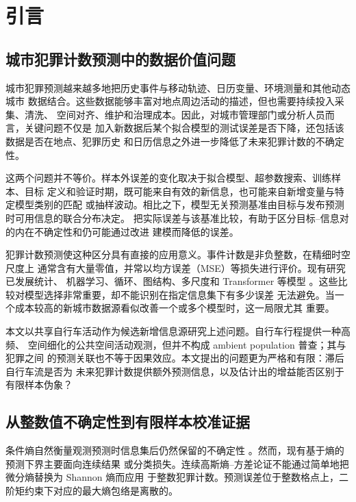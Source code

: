 \section{引言}
\label{sec:introduction}

\subsection{城市犯罪计数预测中的数据价值问题}
\label{subsec:intro_data_value}

城市犯罪预测越来越多地把历史事件与移动轨迹、日历变量、环境测量和其他动态城市
数据结合。这些数据能够丰富对地点周边活动的描述，但也需要持续投入采集、清洗、
空间对齐、维护和治理成本。因此，对城市管理部门或分析人员而言，关键问题不仅是
加入新数据后某个拟合模型的测试误差是否下降，还包括该数据是否在地点、犯罪历史
和日历信息之外进一步降低了未来犯罪计数的不确定性。

这两个问题并不等价。样本外误差的变化取决于拟合模型、超参数搜索、训练样本、目标
定义和验证时期，既可能来自有效的新信息，也可能来自新增变量与特定模型类别的匹配
或抽样波动。相比之下，模型无关预测基准由目标与发布预测时可用信息的联合分布决定。
把实际误差与该基准比较，有助于区分目标--信息对的内在不确定性和仍可能通过改进
建模而降低的误差。

犯罪计数预测使这种区分具有直接的应用意义。事件计数是非负整数，在精细时空尺度上
通常含有大量零值，并常以均方误差（MSE）等损失进行评价。现有研究已发展统计、
机器学习、循环、图结构、多尺度和 Transformer 等模型
\citep{kounadi2020review,du2023review,mandalapu2023review,
alves2018crime,angbera2023model,huang2018deepcrime,deng2023risk,
jing2024multiscale,wang2025mragnn,butt2025start,cui2026transfer,
hu2023fusion}。这些比较对模型选择非常重要，却不能识别在指定信息集下有多少误差
无法避免。当一个成本较高的新城市数据源看似改善一个或多个模型时，这一局限尤其
重要。

本文以共享自行车活动作为候选新增信息源研究上述问题。自行车行程提供一种高频、
空间细化的公共空间活动观测，但并不构成 ambient population 普查；其与犯罪之间
的预测关联也不等于因果效应。本文提出的问题更为严格和有限：滞后自行车流是否为
未来犯罪计数提供额外预测信息，以及估计出的增益能否区别于有限样本伪象？

\subsection{从整数值不确定性到有限样本校准证据}
\label{subsec:intro_calibrated_evidence}

条件熵自然衡量观测预测时信息集后仍然保留的不确定性
\citep{shannon1948,cover_thomas}。然而，现有基于熵的预测下界主要面向连续结果
或分类损失。连续高斯熵--方差论证不能通过简单地把微分熵替换为 Shannon 熵而应用
于整数犯罪计数。预测误差位于整数格点上，二阶矩约束下对应的最大熵包络是离散的。

